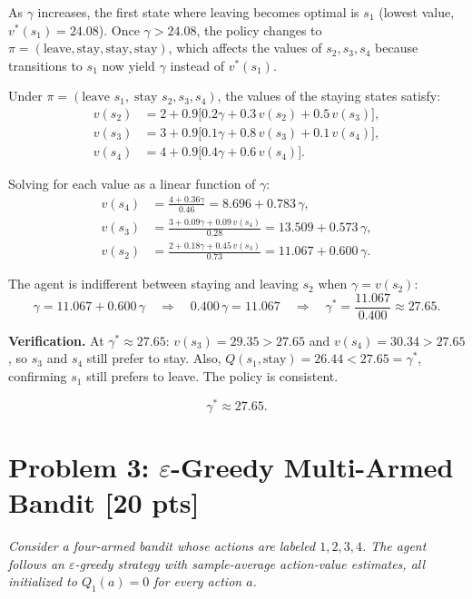 \documentclass[12pt]{article}
\begin{document}
As $\gamma$ increases, the first state where leaving becomes optimal is $s_1$ (lowest value, $v^*(s_1) = 24.08$). Once $\gamma > 24.08$, the policy changes to $\pi = (\text{leave}, \text{stay}, \text{stay}, \text{stay})$, which affects the values of $s_2, s_3, s_4$ because transitions to $s_1$ now yield $\gamma$ instead of $v^*(s_1)$.

Under $\pi = (\text{leave } s_1,\; \text{stay } s_2, s_3, s_4)$, the values of the staying states satisfy:
\begin{align*}
  v(s_2) &= 2 + 0.9\bigl[0.2\gamma + 0.3\, v(s_2) + 0.5\, v(s_3)\bigr], \\
  v(s_3) &= 3 + 0.9\bigl[0.1\gamma + 0.8\, v(s_3) + 0.1\, v(s_4)\bigr], \\
  v(s_4) &= 4 + 0.9\bigl[0.4\gamma + 0.6\, v(s_4)\bigr].
\end{align*}

Solving for each value as a linear function of $\gamma$:
\begin{align*}
  v(s_4) &= \frac{4 + 0.36\gamma}{0.46} = 8.696 + 0.783\,\gamma, \\[4pt]
  v(s_3) &= \frac{3 + 0.09\gamma + 0.09\, v(s_4)}{0.28} = 13.509 + 0.573\,\gamma, \\[4pt]
  v(s_2) &= \frac{2 + 0.18\gamma + 0.45\, v(s_3)}{0.73} = 11.067 + 0.600\,\gamma.
\end{align*}

The agent is indifferent between staying and leaving $s_2$ when $\gamma = v(s_2)$:
\[
  \gamma = 11.067 + 0.600\,\gamma \quad\Longrightarrow\quad 0.400\,\gamma = 11.067 \quad\Longrightarrow\quad \gamma^* = \frac{11.067}{0.400} \approx 27.65.
\]

\textbf{Verification.} At $\gamma^* \approx 27.65$: $v(s_3) = 29.35 > 27.65$ and $v(s_4) = 30.34 > 27.65$, so $s_3$ and $s_4$ still prefer to stay. Also, $Q(s_1, \text{stay}) = 26.44 < 27.65 = \gamma^*$, confirming $s_1$ still prefers to leave. The policy is consistent.

\[
  \boxed{\gamma^* \approx 27.65.}
\]


\section*{Problem 3: $\varepsilon$-Greedy Multi-Armed Bandit \hfill [20 pts]}

\textit{Consider a four-armed bandit whose actions are labeled $1, 2, 3, 4$. The agent follows an $\varepsilon$-greedy strategy with sample-average action-value estimates, all initialized to $Q_1(a) = 0$ for every action $a$.}
\end{document}
